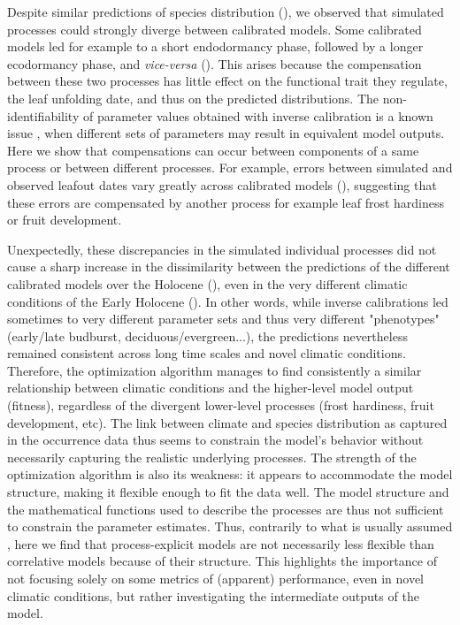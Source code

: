 Despite similar predictions of species distribution (), we observed that simulated processes could strongly diverge between calibrated models. Some calibrated models led for example to a short endodormancy phase, followed by a longer ecodormancy phase, and \textit{vice-versa} (). This arises because the compensation between these two processes has little effect on the functional trait they regulate, the leaf unfolding date, and thus on the predicted distributions. The non-identifiability of parameter values obtained with inverse calibration is a known issue \citep{He2017, Cameron2022, VanderMeersch2023}, when different sets of parameters may result in equivalent model outputs. Here we show that compensations can occur between components of a same process or between different processes. For example, errors between simulated and observed leafout dates vary greatly across calibrated models (), suggesting that these errors are compensated by another process for example leaf frost hardiness or fruit development. 

Unexpectedly, these discrepancies in the simulated individual processes did not cause a sharp increase in the dissimilarity between the predictions of the different calibrated models over the Holocene (), even in the very different climatic conditions of the Early Holocene (). In other words, while inverse calibrations led sometimes to very different parameter sets and thus very different "phenotypes" (early/late budburst, deciduous/evergreen...), the predictions nevertheless remained consistent across long time scales and novel climatic conditions. Therefore, the optimization algorithm manages to find consistently a similar relationship between climatic conditions and the higher-level model output (fitness), regardless of the divergent lower-level processes (frost hardiness, fruit development, etc). The link between climate and species distribution as captured in the occurrence data thus seems to constrain the model's behavior without necessarily capturing the realistic underlying processes. The strength of the optimization algorithm is also its weakness: it appears to accommodate the model structure, making it flexible enough to fit the data well. The model structure and the mathematical functions used to describe the processes are thus not sufficient to constrain the parameter estimates. Thus, contrarily to what is usually assumed \citep{Higgins2020}, here we find that process-explicit models are not necessarily less flexible than correlative models because of their structure. This highlights the importance of not focusing solely on some metrics of (apparent) performance, even in novel climatic conditions, but rather investigating the intermediate outputs of the model.

